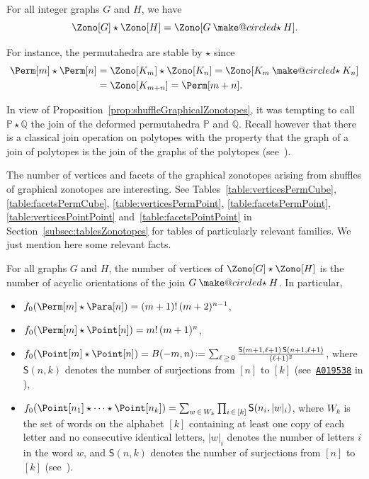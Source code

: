 \documentclass[AHL,Unicode,longabstracts,published]{cedram}
\makeatletter
\newcommand{\eqdef}{\mbox{\,\raisebox{0.2ex}{\scriptsize\ensuremath{\mathrm:}}\ensuremath{=}\,}}
\newcommand{\OEIS}[1]{{\rm \href{http://oeis.org/#1}{\texttt{#1}}}}
\newcommand{\ostar}{\mathbin{\mathpalette\make@circled\star}}
\newcommand{\make@circled}[2]{%
  \ooalign{$\m@th#1\smallbigcirc{#1}$\cr\hidewidth$\m@th#1#2$\hidewidth\cr}%
}
\newcommand{\smallbigcirc}[1]{%
  \vcenter{\hbox{\scalebox{0.77778}{$\m@th#1\bigcirc$}}}%
}
\newcommand{\joinGraph}{\ostar} %
\newcommand{\shuffleDP}{\star} %
\newcommand{\polytope}[1]{\mathds{#1}}
\newcommand{\surjections}[2]{\mathsf{S}(#1,#2)}
\makeatother
\begin{document}
\begin{prop}\label{prop:shuffleGraphicalZonotopes}
For all integer graphs $G$ and $H$, we have
\[
\Zono[G] \shuffleDP \Zono[H] = \Zono[G \joinGraph H].
\]
\end{prop}

\begin{exam}\label{exm:shufflePermutahedra}
For instance, the permutahedra are stable by $\shuffleDP$ since
\begin{align*}
\Perm[m] \shuffleDP \Perm[n] & = \Zono[K_m] \shuffleDP \Zono[K_n] = \Zono[K_m \joinGraph K_n] \\
& = \Zono[K_{m+n}] = \Perm[m+n].
\end{align*}
\end{exam}

In view of Proposition~\ref{prop:shuffleGraphicalZonotopes}, it was tempting to call $\polytope{P} \shuffleDP \polytope{Q}$ the join of the deformed permutahedra $\polytope{P}$ and $\polytope{Q}$. Recall however that there is a classical join operation on polytopes with the property that the graph of a join of polytopes is the join of the graphs of the polytopes (see~\cite[Ex.~9.9, p.~323]{Ziegler-polytopes}).

The number of vertices and facets of the graphical zonotopes arising from shuffles of graphical zonotopes are interesting. See Tables~\ref{table:verticesPermCube}, \ref{table:facetsPermCube}, \ref{table:verticesPermPoint}, \ref{table:facetsPermPoint}, \ref{table:verticesPointPoint} and~\ref{table:facetsPointPoint} in Section~\ref{subsec:tablesZonotopes} for tables of particularly relevant families. We just mention here some relevant facts.

\begin{prop}\label{prop:numberVerticesShuffleGraphicalZonotopes}
For all graphs $G$ and $H$, the number of vertices of \linebreak $\Zono[G] \shuffleDP \Zono[H]$ is the number of acyclic orientations of the join $G \joinGraph H$. In particular,
\begin{itemize}
\item $f_0 (\Perm[m] \shuffleDP \Para[n] ) = (m+1)! \, (m+2)^{n-1}$,
\item $f_0 (\Perm[m] \shuffleDP \Point[n] ) = m! \, (m+1)^n $,
\item $f_0 (\Point[m] \shuffleDP \Point[n] ) = B(-m,n) \eqdef \sum_{\ell\,\ge\,0} \frac{\surjections{m+1}{\ell+1} \, \surjections{n+1}{\ell+1}}{(\ell+1)^2}$, where \linebreak$\surjections{n}{k}$ denotes the number of surjections from $[n]$ to $[k]$ (see~\OEIS{A019538} in \cite{OEIS}),
\item $f_0 (\Point[n_1] \shuffleDP \cdots \shuffleDP \Point[n_k] ) = \sum_{w\,\in\,W_k} \prod_{i\,\in\,[k]} \surjections{n_i}{|w|_i}$, where $W_k$ is the set of words on the alphabet $[k]$ containing at least one copy of each letter and no consecutive identical letters, $|w|_i$ denotes the number of letters $i$ in the word $w$, and $\surjections{n}{k}$ denotes the number of surjections from $[n]$ to $[k]$ (see~\cite[\OEIS{A019538}]{OEIS}).
\end{itemize}
\end{prop}
\end{document}
